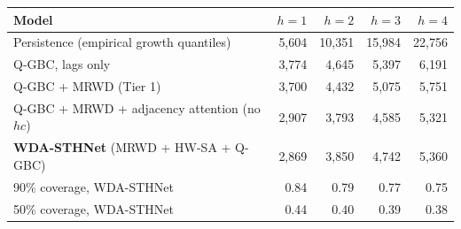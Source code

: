\begin{tabular}{lrrrr}
\toprule
Model & $h=1$ & $h=2$ & $h=3$ & $h=4$ \\
\midrule
Persistence (empirical growth quantiles) & 5,604 & 10,351 & 15,984 & 22,756 \\
Q-GBC, lags only & 3,774 & 4,645 & 5,397 & 6,191 \\
Q-GBC + MRWD (Tier 1) & 3,700 & 4,432 & 5,075 & 5,751 \\
Q-GBC + MRWD + adjacency attention (no $hc$) & 2,907 & 3,793 & 4,585 & 5,321 \\
\textbf{WDA-STHNet} (MRWD + HW-SA + Q-GBC) & 2,869 & 3,850 & 4,742 & 5,360 \\
\midrule
90\% coverage, WDA-STHNet & 0.84 & 0.79 & 0.77 & 0.75 \\
50\% coverage, WDA-STHNet & 0.44 & 0.40 & 0.39 & 0.38 \\
\bottomrule
\end{tabular}
